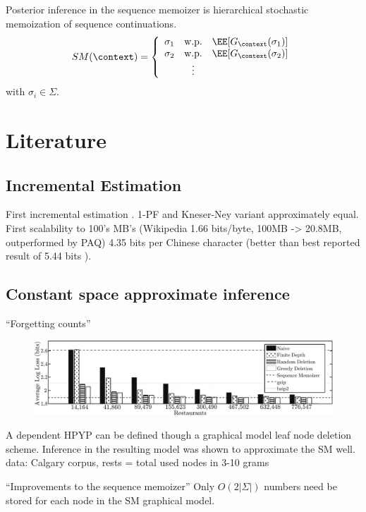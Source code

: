 \documentclass[16pt]{beamer}
\begin{document}
\begin{frame}[t]{}
\begin{frame}[t]{}
Posterior inference in the sequence memoizer is hierarchical stochastic memoization of sequence continuations. 
\begin{align*}
SM(\context) = \left\{\begin{array}{ccc}
\sigma_1  & \mbox{w.p.}  &  \EE[G_\context(\sigma_1)] \\
\sigma_2  & \mbox{w.p.}  &  \EE[G_\context(\sigma_2)]  \\
  &  \vdots &   
\end{array}\right.
\end{align*}
with $\sigma_i \in \Sigma$.
\vspace{.5cm}
\end{frame}

\section{Literature}
\subsection{Incremental Estimation}
\begin{frame}[t]{}
First incremental estimation \citet{Gasthaus2010}.  1-PF and Kneser-Ney variant approximately equal.
First scalability to 100's MB's (Wikipedia 1.66 bits/byte, 100MB -> 20.8MB, outperformed by PAQ)
4.35 bits per Chinese character (better than best reported result of 5.44 bits \cite{Wu2007}).
\end{frame}

\subsection{Constant space approximate inference}
\begin{frame}[t]{}
\begin{block}{``Forgetting counts'' \citet{Bartlett2010}}
\begin{figure}[htbp]
\begin{center}
\includegraphics[width=\textwidth]{results_calgary_corpus.pdf}
\end{center}
\end{figure}
A dependent HPYP can be defined though a graphical model leaf node deletion scheme.  Inference in the resulting model was shown to approximate the SM well.  \tiny{data: Calgary corpus, rests = total used nodes in 3-10 grams}
\end{block}
\begin{block}{``Improvements to the sequence memoizer'' \citet{Gasthaus2011}}
Only $O(2|\Sigma|)$ numbers need be stored for each node in the SM graphical model.
\end{block}


\end{frame}
\end{frame}
\end{document}
